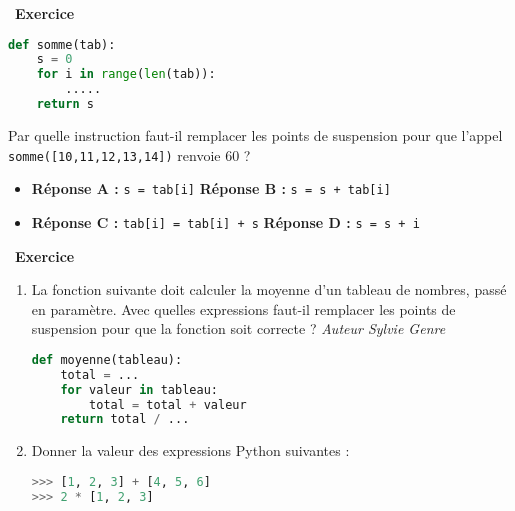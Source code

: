 \documentclass[
  11pt,
]{article}
\newcommand{\passthrough}[1]{#1}
\providecommand{\tightlist}{%
  \setlength{\itemsep}{0pt}\setlength{\parskip}{0pt}}
\newcounter{exo}
\newenvironment{exercice}[1]
{\par \medskip   \addtocounter{exo}{1} \noindent  
\begin{bclogo}[arrondi =0.1,   noborder = true, logo=\bccrayon, marge=4]{~\textbf{Exercice} \textbf{\theexo} {\itshape #1} }  \par}
{
\end{bclogo}
 \par \bigskip }
\newcounter{def}
\begin{document}
\begin{exercice}{}
\begin{lstlisting}[language=Python]
def somme(tab):
    s = 0
    for i in range(len(tab)):
        .....
    return s
\end{lstlisting}

Par quelle instruction faut-il remplacer les points de suspension pour
que l'appel \passthrough{\lstinline!somme([10,11,12,13,14])!} renvoie 60
?

\begin{itemize}
\tightlist
\item
  \textbf{Réponse A :} \passthrough{\lstinline!s = tab[i]!}
  \textbf{Réponse B :} \passthrough{\lstinline!s = s + tab[i]!}
\item
  \textbf{Réponse C :} \passthrough{\lstinline!tab[i] = tab[i] + s!}
  \textbf{Réponse D :} \passthrough{\lstinline!s = s + i!}
\end{itemize}

\end{exercice}

\begin{exercice}{}

\begin{enumerate}
\def\labelenumi{\arabic{enumi}.}
\item
  La fonction suivante doit calculer la moyenne d'un tableau de nombres,
  passé en paramètre. Avec quelles expressions faut-il remplacer les
  points de suspension pour que la fonction soit correcte ? \emph{Auteur
  Sylvie Genre}

\begin{lstlisting}[language=Python]
def moyenne(tableau):
    total = ...
    for valeur in tableau:
        total = total + valeur
    return total / ...
\end{lstlisting}
\item
  Donner la valeur des expressions Python suivantes :

\begin{lstlisting}[language=Python]
>>> [1, 2, 3] + [4, 5, 6]
>>> 2 * [1, 2, 3]
\end{lstlisting}
\end{enumerate}

\end{exercice}
\end{document}
